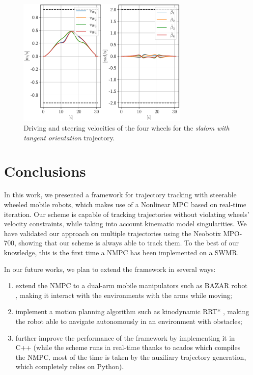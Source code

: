 \begin{figure}
    \centering
    \includegraphics[width=0.75\textwidth]{figures/SWMR/simulations/slalom_with_tangent_orientation/wheels_velocities.pdf}
    \caption{Driving and steering velocities of the four wheels for the \textit{slalom with tangent orientation} trajectory.}
    \label{fig:simulations:slalom-with-tangent-orientation:wheel-velocities}
\end{figure}

\section{Conclusions}
\label{sec:conclusions}
In this work, we presented a framework for trajectory tracking with steerable wheeled mobile robots, which makes use of a Nonlinear MPC based on real-time iteration. Our scheme is capable of tracking trajectories without violating wheels' velocity constraints, while taking into account kinematic model singularities. We have validated our approach on multiple trajectories using the Neobotix MPO-700, showing that our scheme is always able to track them. To the best of our knowledge, this is the first time a NMPC has been implemented on a SWMR.

In our future works, we plan to extend the framework in several ways:
\begin{enumerate}
    \item extend the NMPC to a dual-arm mobile manipulators such as BAZAR robot \cite{Cherubini2019ACR}, making it interact with the environments with the arms while moving;
    \item implement a motion planning algorithm such as kinodynamic RRT* \cite{Webb2013KinodynamicRRTstar}, making the robot able to navigate autonomously in an environment with obstacles;
    \item further improve the performance of the framework by implementing it in C++ (while the scheme runs in real-time thanks to acados which compiles the NMPC, most of the time is taken by the auxiliary trajectory generation, which completely relies on Python).
\end{enumerate}
